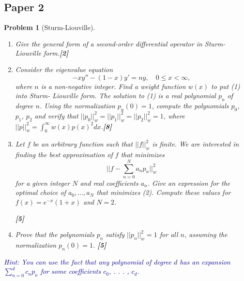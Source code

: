 \documentclass[a4paper]{article}
\theoremstyle{new}
\newtheorem{qns}{Problem}[section]
\begin{document}
\subsection{Paper 2}
\begin{qns}[Sturm-Liouville]\leavevmode
\begin{enumerate}[label=(\alph*)]
\item Give the general form of a second-order differential operator in Sturm-Liouville
form.\hfill\textbf{[2]}
\item Consider the eigenvalue equation
\begin{equation}
    -xy''-(1-x)y'=ny,\quad0\leq x<\infty,\tag{1}
\end{equation}
where $n$ is a non-negative integer. Find a weight function $w(x)$ to put (1) into Sturm- Liouville form. The solution to (1) is a real polynomial $p_n$ of degree $n$. Using the normalization $p_n(0) = 1$, compute the polynomials $p_0$, $p_1$, $p_2$ and verify that $||p_0||^2_w=||p_1||^2_w=||p_2||_w^2=1$, where $||p||_w^2=\int_0^\infty w(x)p(x)^2dx$.\hfill\textbf{[8]}
\item Let $f$ be an arbitrary function such that $||f||_w^2$ is finite. We are interested in finding the best approximation of $f$ that minimizes
\begin{equation}
    \bigg|\bigg|f-\sum_{n=0}^Na_np_n\bigg|\bigg|_w^2\tag{2}
\end{equation}
for a given integer $N$ and real coefficients $a_n$. Give an expression for the optimal choice of $a_0,\dots, a_N$ that minimizes (2). Compute these values for $f(x) = e^{−x}(1 + x)$ and $N = 2$. 

\hfill\textbf{[5]}
\item Prove that the polynomials $p_n$ satisfy $||p_n||^2_w=1$ for all $n$, assuming the normalization $p_n(0) = 1$. \hfill\textbf{[5]}
\end{enumerate}
\begin{mdframed}\textcolor{darkblue}{Hint: You can use the fact that any polynomial of degree $d$ has an expansion $\sum_{n=0}^dc_np_n$ for some coefficients $c_0$, . . . , $c_d$.}
\end{mdframed}
\end{qns}
\end{document}
